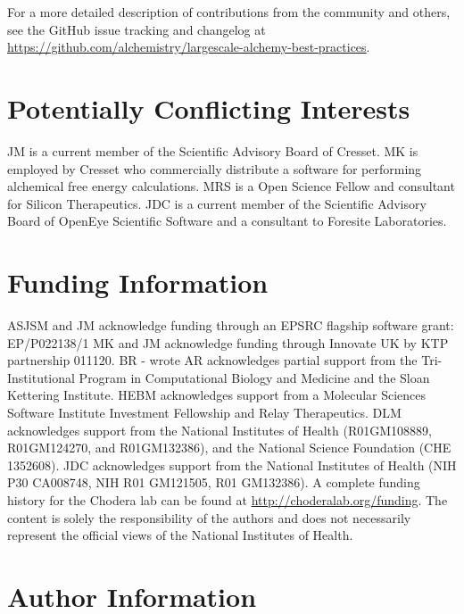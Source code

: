 \documentclass[9pt,bestpractices,pubversion]{livecoms}
\newcommand{\githubrepository}{\url{https://github.com/alchemistry/largescale-alchemy-best-practices}} %
\begin{document}
For a more detailed description of contributions from the community and others, 
see the GitHub issue tracking and changelog at \githubrepository.


\section*{Potentially Conflicting Interests}
JM is a current member of the Scientific Advisory Board of Cresset. 
MK is employed by Cresset who commercially distribute a software for performing alchemical free energy calculations. MRS is a Open Science Fellow and consultant for Silicon Therapeutics.
JDC is a current member of the Scientific Advisory Board of OpenEye Scientific Software and a consultant to Foresite Laboratories.
\section*{Funding Information}
ASJSM and JM acknowledge funding through an EPSRC flagship software grant: EP/P022138/1
MK and JM acknowledge funding through Innovate UK by KTP partnership 011120.
BR - wrote 
AR acknowledges partial support from the Tri-Institutional Program in Computational Biology and Medicine and the Sloan Kettering Institute.
HEBM acknowledges support from a Molecular Sciences Software Institute Investment Fellowship and Relay Therapeutics.
DLM acknowledges support from the National Institutes of Health (R01GM108889, R01GM124270, and R01GM132386), and the National Science Foundation (CHE 1352608).
JDC acknowledges support from the National Institutes of Health (NIH P30 CA008748, NIH R01 GM121505, R01 GM132386).
A complete funding history for the Chodera lab can be found at \url{http://choderalab.org/funding}.
The content is solely the responsibility of the authors and does not necessarily represent the official views of the National Institutes of Health.

\section*{Author Information}
\makeorcid



\end{document}
